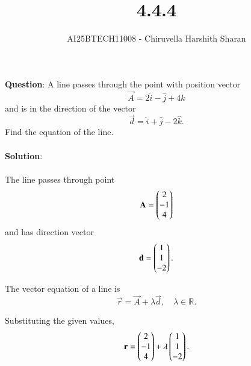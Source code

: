 \documentclass[journal]{IEEEtran}
\begin{document}

\vspace{3cm}

\title{4.4.4}
\author{AI25BTECH11008 - Chiruvella Harshith Sharan}
{\let\newpage\relax\maketitle}

\renewcommand{\thefigure}{\theenumi}
\renewcommand{\thetable}{\theenumi}
\setlength{\intextsep}{10pt} 

\renewcommand{\thetable}{\theenumi}

\textbf{Question}: A line passes through the point with position vector 
\[
\vec{A} = 2\hat{i} - \hat{j} + 4\hat{k}
\]
and is in the direction of the vector 
\[
\vec{d} = \hat{i} + \hat{j} - 2\hat{k}.
\] 
Find the equation of the line. \\\\[0.3cm]

\textbf{Solution}: \\\\[0.3cm]

The line passes through point 
\begin{equation}
\mathbf{A} = \begin{pmatrix}2 \\ -1 \\ 4\end{pmatrix}
\end{equation}
and has direction vector 
\begin{equation}
\mathbf{d} = \begin{pmatrix}1 \\ 1 \\ -2\end{pmatrix}.
\end{equation}

\vspace{0.3cm}

The vector equation of a line is
\begin{equation}
\vec{r} = \vec{A} + \lambda \vec{d}, \quad \lambda \in \mathbb{R}.
\end{equation}

Substituting the given values,
\begin{equation}
\mathbf{r} = \begin{pmatrix}2 \\ -1 \\ 4\end{pmatrix} + \lambda \begin{pmatrix}1 \\ 1 \\ -2\end{pmatrix}.
\end{equation}

\vspace{0.3cm}
\end{document}
